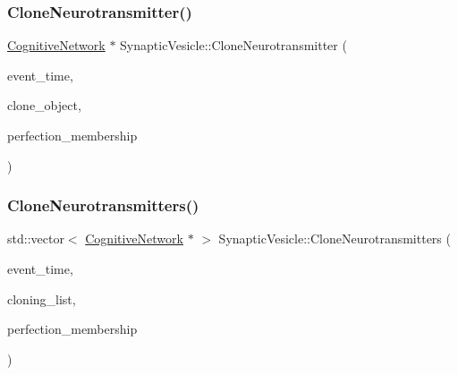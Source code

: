 \mbox{\label{classSynapticVesicle_aa811e68d1a3220c07140847eb3ebc8b3}} 
\subsubsection{\texorpdfstring{Clone\+Neurotransmitter()}{CloneNeurotransmitter()}}
{\footnotesize\ttfamily \mbox{\hyperlink{classCognitiveNetwork}{Cognitive\+Network}} $\ast$ Synaptic\+Vesicle\+::\+Clone\+Neurotransmitter (\begin{DoxyParamCaption}\item[{std\+::chrono\+::time\+\_\+point$<$ \mbox{\hyperlink{universe_8h_a0ef8d951d1ca5ab3cfaf7ab4c7a6fd80}{Clock}} $>$}]{event\+\_\+time,  }\item[{\mbox{\hyperlink{classCognitiveNetwork}{Cognitive\+Network}} $\ast$}]{clone\+\_\+object,  }\item[{double}]{perfection\+\_\+membership }\end{DoxyParamCaption})}

\mbox{\label{classSynapticVesicle_aa610e38786a8c9978d9c00bca40a5200}} 
\subsubsection{\texorpdfstring{Clone\+Neurotransmitters()}{CloneNeurotransmitters()}}
{\footnotesize\ttfamily std\+::vector$<$ \mbox{\hyperlink{classCognitiveNetwork}{Cognitive\+Network}} $\ast$ $>$ Synaptic\+Vesicle\+::\+Clone\+Neurotransmitters (\begin{DoxyParamCaption}\item[{std\+::chrono\+::time\+\_\+point$<$ \mbox{\hyperlink{universe_8h_a0ef8d951d1ca5ab3cfaf7ab4c7a6fd80}{Clock}} $>$}]{event\+\_\+time,  }\item[{std\+::vector$<$ \mbox{\hyperlink{classCognitiveNetwork}{Cognitive\+Network}} $\ast$$>$}]{cloning\+\_\+list,  }\item[{double}]{perfection\+\_\+membership }\end{DoxyParamCaption})}

